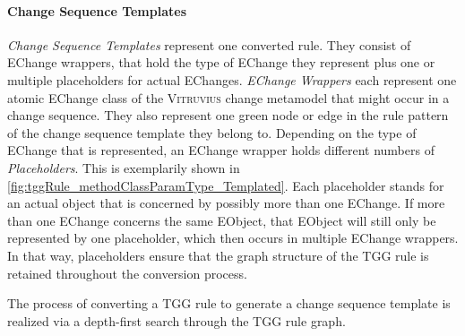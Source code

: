 \paragraph{Change Sequence Templates} \emph{Change Sequence Templates} represent one converted rule. They consist of EChange wrappers, that hold the type of EChange they represent plus one or multiple placeholders for actual EChanges.
\emph{EChange Wrappers} each represent one atomic EChange class of the \textsc{Vitruvius} change metamodel that might occur in a change sequence. They also represent one green node or edge in the rule pattern of the change sequence template they belong to.
Depending on the type of EChange that is represented, an EChange wrapper holds different numbers of \emph{Placeholders}. This is exemplarily shown in \autoref{fig:tggRule_methodClassParamType_Templated}.
Each placeholder stands for an actual object that is concerned by possibly more than one EChange.
If more than one EChange concerns the same EObject, that EObject will still only be represented by one placeholder, which then occurs in multiple EChange wrappers.
In that way, placeholders ensure that the graph structure of the TGG rule is retained throughout the conversion process.

The process of converting a TGG rule to generate a change sequence template is realized via a depth-first search through the TGG rule graph.


